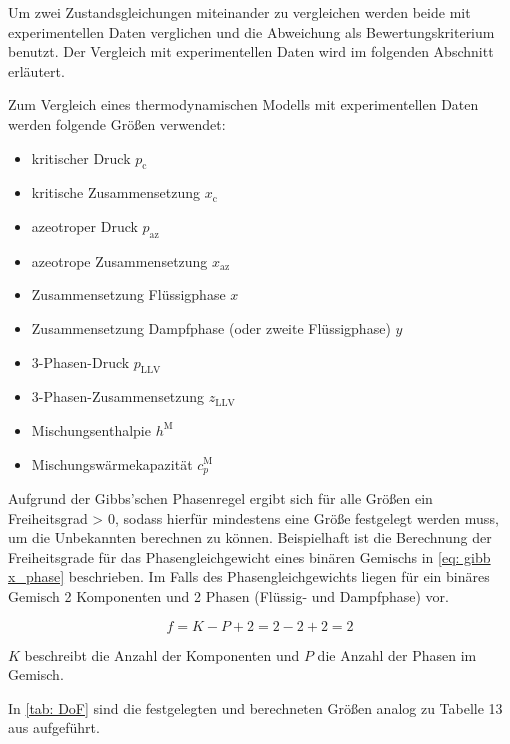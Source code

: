 \documentclass[../thesis.tex]{subfiles}
\begin{document}
Um zwei Zustandsgleichungen miteinander zu vergleichen werden beide mit experimentellen Daten verglichen und die Abweichung als Bewertungskriterium benutzt. Der Vergleich mit experimentellen Daten wird im folgenden Abschnitt erläutert.

Zum Vergleich eines thermodynamischen Modells mit experimentellen Daten werden folgende Größen verwendet:
\begin{itemize}
	\item kritischer Druck $ p_\mathrm{c} $
	\item kritische Zusammensetzung $ x_\mathrm{c} $
	\item azeotroper Druck $ p_\mathrm{az} $
	\item azeotrope Zusammensetzung $ x_\mathrm{az} $
	\item Zusammensetzung Flüssigphase $ x $
	\item Zusammensetzung Dampfphase (oder zweite Flüssigphase) $ y $
	\item 3-Phasen-Druck $p_{\mathrm{LLV}}$
	\item 3-Phasen-Zusammensetzung $z_{\mathrm{LLV}}$
	\item Mischungsenthalpie $h^{\mathrm{M}}$
	\item Mischungswärmekapazität $c_p^{\mathrm{M}}$
\end{itemize}

Aufgrund der Gibbs'schen Phasenregel ergibt sich für alle Größen ein Freiheitsgrad > 0, sodass hierfür mindestens eine Größe festgelegt werden muss, um die Unbekannten berechnen zu können. Beispielhaft ist die Berechnung der Freiheitsgrade für das Phasengleichgewicht eines binären Gemischs in \autoref{eq: gibb x_phase} beschrieben. Im Falls des Phasengleichgewichts liegen für ein binäres Gemisch 2 Komponenten und 2 Phasen (Flüssig- und Dampfphase) vor.

\begin{equation}
	\label{eq: gibb x_phase}
	f = K - P + 2 = 2 - 2 + 2 = 2
\end{equation}

$ K $ beschreibt die Anzahl der Komponenten und $ P $ die Anzahl der Phasen im Gemisch.

In \autoref{tab: DoF} sind die festgelegten und berechneten Größen analog zu Tabelle 13 aus \cite{jaubert2020benchmark} aufgeführt.
\end{document}
